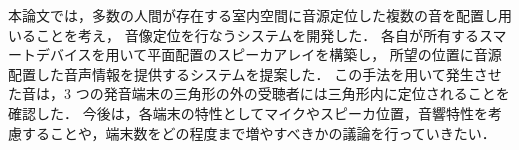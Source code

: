本論文では，多数の人間が存在する室内空間に音源定位した複数の音を配置し用いることを考え，
音像定位を行なうシステムを開発した．
各自が所有するスマートデバイスを用いて平面配置のスピーカアレイを構築し，
所望の位置に音源配置した音声情報を提供するシステムを提案した．
この手法を用いて発生させた音は，3 つの発音端末の三角形の外の受聴者には三角形内に定位されることを確認した．
今後は，各端末の特性としてマイクやスピーカ位置，音響特性を考慮することや，端末数をどの程度まで増やすべきかの議論を行っていきたい．
